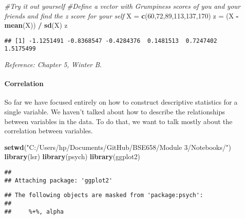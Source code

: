 \documentclass[
]{article}
\newenvironment{Shaded}{\begin{snugshade}}{\end{snugshade}}
\newcommand{\CommentTok}[1]{\textcolor[rgb]{0.56,0.35,0.01}{\textit{#1}}}
\newcommand{\DecValTok}[1]{\textcolor[rgb]{0.00,0.00,0.81}{#1}}
\newcommand{\FunctionTok}[1]{\textcolor[rgb]{0.13,0.29,0.53}{\textbf{#1}}}
\newcommand{\NormalTok}[1]{#1}
\newcommand{\OtherTok}[1]{\textcolor[rgb]{0.56,0.35,0.01}{#1}}
\newcommand{\SpecialCharTok}[1]{\textcolor[rgb]{0.81,0.36,0.00}{\textbf{#1}}}
\newcommand{\StringTok}[1]{\textcolor[rgb]{0.31,0.60,0.02}{#1}}
\begin{document}
\begin{Shaded}
\begin{Highlighting}[]
\CommentTok{\#Try it out yourself}
\CommentTok{\#Define a vector with Grumpiness scores of you and your friends and find the z score for your self}
\NormalTok{X }\OtherTok{=} \FunctionTok{c}\NormalTok{(}\DecValTok{60}\NormalTok{,}\DecValTok{72}\NormalTok{,}\DecValTok{89}\NormalTok{,}\DecValTok{113}\NormalTok{,}\DecValTok{137}\NormalTok{,}\DecValTok{170}\NormalTok{)                       }
\NormalTok{z }\OtherTok{=}\NormalTok{ (X }\SpecialCharTok{{-}} \FunctionTok{mean}\NormalTok{(X)) }\SpecialCharTok{/} \FunctionTok{sd}\NormalTok{(X)}
\NormalTok{z}
\end{Highlighting}
\end{Shaded}

\begin{verbatim}
## [1] -1.1251491 -0.8368547 -0.4284376  0.1481513  0.7247402  1.5175499
\end{verbatim}

\emph{Reference: Chapter 5, Winter B.}

\paragraph{Correlation}\label{correlation}

So far we have focused entirely on how to construct descriptive
statistics for a single variable. We haven't talked about how to
describe the relationships between variables in the data. To do that, we
want to talk mostly about the correlation between variables.

\begin{Shaded}
\begin{Highlighting}[]
\FunctionTok{setwd}\NormalTok{(}\StringTok{"C:/Users/hp/Documents/GitHub/BSE658/Module 3/Notebooks/"}\NormalTok{)}
\FunctionTok{library}\NormalTok{(lsr)}
\FunctionTok{library}\NormalTok{(psych)}
\FunctionTok{library}\NormalTok{(ggplot2)}
\end{Highlighting}
\end{Shaded}

\begin{verbatim}
## 
## Attaching package: 'ggplot2'
\end{verbatim}

\begin{verbatim}
## The following objects are masked from 'package:psych':
## 
##     %+%, alpha
\end{verbatim}
\end{document}
